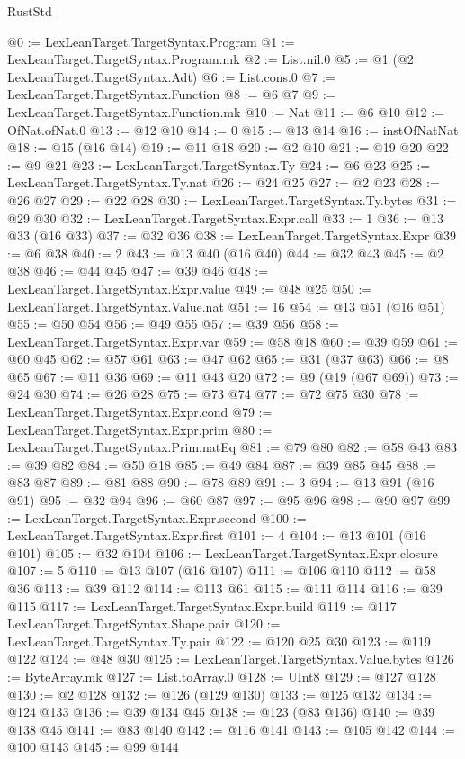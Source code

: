 \begin{lexlean}{RustStd}
\begin{coremodule}
@0 := LexLeanTarget.TargetSyntax.Program
@1 := LexLeanTarget.TargetSyntax.Program.mk
@2 := List.nil.{0}
@5 := @1 (@2 LexLeanTarget.TargetSyntax.Adt)
@6 := List.cons.{0}
@7 := LexLeanTarget.TargetSyntax.Function
@8 := @6 @7
@9 := LexLeanTarget.TargetSyntax.Function.mk
@10 := Nat
@11 := @6 @10
@12 := OfNat.ofNat.{0}
@13 := @12 @10
@14 := 0
@15 := @13 @14
@16 := instOfNatNat
@18 := @15 (@16 @14)
@19 := @11 @18
@20 := @2 @10
@21 := @19 @20
@22 := @9 @21
@23 := LexLeanTarget.TargetSyntax.Ty
@24 := @6 @23
@25 := LexLeanTarget.TargetSyntax.Ty.nat
@26 := @24 @25
@27 := @2 @23
@28 := @26 @27
@29 := @22 @28
@30 := LexLeanTarget.TargetSyntax.Ty.bytes
@31 := @29 @30
@32 := LexLeanTarget.TargetSyntax.Expr.call
@33 := 1
@36 := @13 @33 (@16 @33)
@37 := @32 @36
@38 := LexLeanTarget.TargetSyntax.Expr
@39 := @6 @38
@40 := 2
@43 := @13 @40 (@16 @40)
@44 := @32 @43
@45 := @2 @38
@46 := @44 @45
@47 := @39 @46
@48 := LexLeanTarget.TargetSyntax.Expr.value
@49 := @48 @25
@50 := LexLeanTarget.TargetSyntax.Value.nat
@51 := 16
@54 := @13 @51 (@16 @51)
@55 := @50 @54
@56 := @49 @55
@57 := @39 @56
@58 := LexLeanTarget.TargetSyntax.Expr.var
@59 := @58 @18
@60 := @39 @59
@61 := @60 @45
@62 := @57 @61
@63 := @47 @62
@65 := @31 (@37 @63)
@66 := @8 @65
@67 := @11 @36
@69 := @11 @43 @20
@72 := @9 (@19 (@67 @69))
@73 := @24 @30
@74 := @26 @28
@75 := @73 @74
@77 := @72 @75 @30
@78 := LexLeanTarget.TargetSyntax.Expr.cond
@79 := LexLeanTarget.TargetSyntax.Expr.prim
@80 := LexLeanTarget.TargetSyntax.Prim.natEq
@81 := @79 @80
@82 := @58 @43
@83 := @39 @82
@84 := @50 @18
@85 := @49 @84
@87 := @39 @85 @45
@88 := @83 @87
@89 := @81 @88
@90 := @78 @89
@91 := 3
@94 := @13 @91 (@16 @91)
@95 := @32 @94
@96 := @60 @87
@97 := @95 @96
@98 := @90 @97
@99 := LexLeanTarget.TargetSyntax.Expr.second
@100 := LexLeanTarget.TargetSyntax.Expr.first
@101 := 4
@104 := @13 @101 (@16 @101)
@105 := @32 @104
@106 := LexLeanTarget.TargetSyntax.Expr.closure
@107 := 5
@110 := @13 @107 (@16 @107)
@111 := @106 @110
@112 := @58 @36
@113 := @39 @112
@114 := @113 @61
@115 := @111 @114
@116 := @39 @115
@117 := LexLeanTarget.TargetSyntax.Expr.build
@119 := @117 LexLeanTarget.TargetSyntax.Shape.pair
@120 := LexLeanTarget.TargetSyntax.Ty.pair
@122 := @120 @25 @30
@123 := @119 @122
@124 := @48 @30
@125 := LexLeanTarget.TargetSyntax.Value.bytes
@126 := ByteArray.mk
@127 := List.toArray.{0}
@128 := UInt8
@129 := @127 @128
@130 := @2 @128
@132 := @126 (@129 @130)
@133 := @125 @132
@134 := @124 @133
@136 := @39 @134 @45
@138 := @123 (@83 @136)
@140 := @39 @138 @45
@141 := @83 @140
@142 := @116 @141
@143 := @105 @142
@144 := @100 @143
@145 := @99 @144

\end{coremodule}
\end{lexlean}
